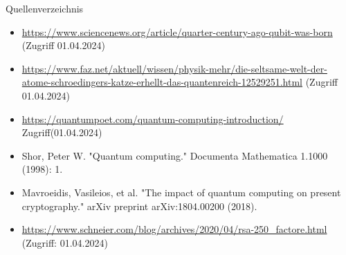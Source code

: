 \documentclass{beamer}
\begin{document}
\begin{frame}{Quellenverzeichnis}
\begin{itemize}
    \item \url{https://www.sciencenews.org/article/quarter-century-ago-qubit-was-born}  (Zugriff 01.04.2024)
    \item \url{https://www.faz.net/aktuell/wissen/physik-mehr/die-seltsame-welt-der-atome-schroedingers-katze-erhellt-das-quantenreich-12529251.html} (Zugriff 01.04.2024)
    \item \url{https://quantumpoet.com/quantum-computing-introduction/} Zugriff(01.04.2024)
    \item Shor, Peter W. "Quantum computing." Documenta Mathematica 1.1000 (1998): 1.
    \item Mavroeidis, Vasileios, et al. "The impact of quantum computing on present cryptography." arXiv preprint arXiv:1804.00200 (2018).
    \item \url{https://www.schneier.com/blog/archives/2020/04/rsa-250_factore.html} (Zugriff: 01.04.2024)


\end{itemize}
    
\end{frame}
\end{document}
